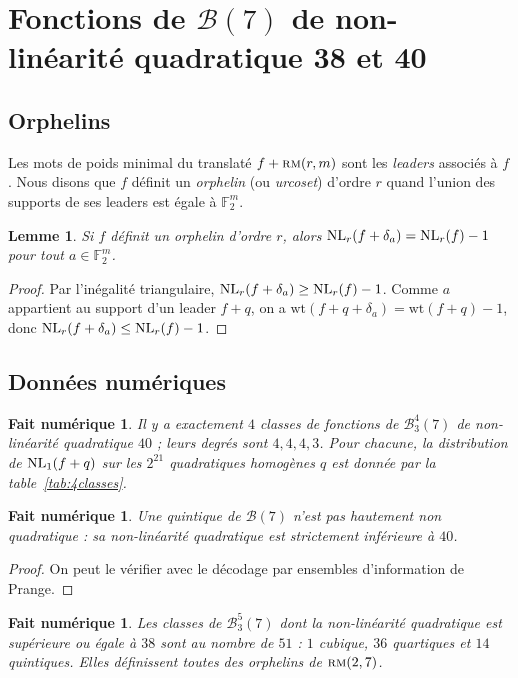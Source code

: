\documentclass[11pt,a4paper]{article}
\newcommand{\wt}{\mathrm{wt}}
\def\bst(#1,#2,#3){\mathcal{B}_{#1}^{#2}(#3)}
\def\NL(#1,#2){ {\rm NL}_{#1}(#2) }
\def\rmc(#1,#2){ \textsc {rm}(#1,#2) }
\def\boole(#1){\mathcal{B}(#1)}
\def\fd(#1){\mathbb{F}_2^{#1}}
\theoremstyle{plain}
\newtheorem{result}[theorem]{Fait numérique}
\newtheorem{lemma}[theorem]{Lemme}
\theoremstyle{definition}
\theoremstyle{remark}
\begin{document}
\section{Fonctions de $\boole(7)$ de non-linéarité quadratique 38 et  40}\label{sec:nq40}

\subsection{Orphelins}
Les mots de poids minimal du translaté $f+\rmc(r,m)$ sont les \emph{leaders}
associés à $f$. Nous disons que $f$ définit un \emph{orphelin} (ou
\emph{urcoset}) d'ordre $r$ quand l'union des supports de ses leaders est égale
à $\fd(m)$.

\begin{lemma}\label{lem:orphan}
Si $f$ définit un orphelin d'ordre $r$, alors
$\NL(r,f+\delta_a)=\NL(r,f)-1$ pour tout $a\in\fd(m)$.
\end{lemma}
\begin{proof}
Par l'inégalité triangulaire, $\NL(r,f+\delta_a)\ge\NL(r,f)-1$. Comme $a$
appartient au support d'un leader $f+q$, on a
$\wt(f+q+\delta_a)=\wt(f+q)-1$, donc $\NL(r,f+\delta_a)\le\NL(r,f)-1$.
\end{proof}

\subsection{Données numériques}

\begin{result}\label{fait:quartiques}
Il y a exactement $4$ classes de fonctions de $\bst(3,4,7)$ de non-linéarité
quadratique $40$ ; leurs degrés sont $4,4,4,3$. Pour chacune, la distribution
de $\NL(1,f+q)$ sur les $2^{21}$ quadratiques homogènes $q$ est donnée par la
table~\ref{tab:4classes}.
\end{result}

\begin{result}\label{fait:quintiques}
Une quintique de $\boole(7)$ n'est pas hautement non quadratique : sa
non-linéarité quadratique est strictement inférieure à $40$.
\end{result}
\begin{proof}
On peut le vérifier avec le décodage par ensembles d'information de Prange.
\end{proof}

\begin{result}\label{fait:51}
Les classes de $\bst(3,5,7)$ dont la non-linéarité quadratique est supérieure
ou égale à $38$ sont au nombre de $51$ : $1$ cubique, $36$ quartiques et $14$
quintiques. Elles définissent toutes des orphelins de $\rmc(2,7)$.
\end{result}
\end{document}
